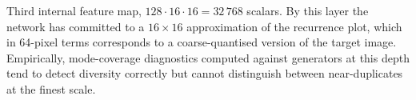 
Third internal feature map, $128 \cdot 16 \cdot 16 = 32\,768$ scalars.
By this layer the network has committed to a $16 \times 16$
approximation of the recurrence plot, which in 64-pixel terms
corresponds to a coarse-quantised version of the target image.
Empirically, mode-coverage diagnostics computed against generators at
this depth tend to detect diversity correctly but cannot distinguish
between near-duplicates at the finest scale.
